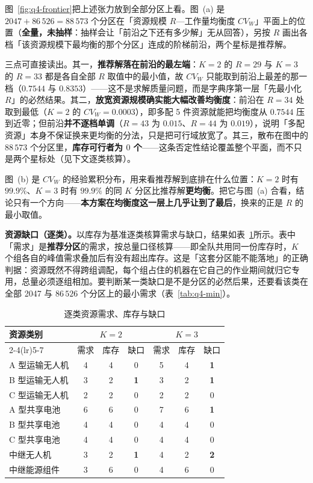 图~\ref{fig:q4-frontier}把上述张力放到全部分区上看。图~(a) 是 $2047+86\,526=88\,573$ 个分区在「资源规模 $R$—工作量均衡度 $CV_W$」平面上的位置（\textbf{全量，未抽样}：抽样会让「前沿之下还有多少解」无从回答），另按 $R$ 画出各档「该资源规模下最均衡的那个分区」连成的阶梯前沿，两个星标是推荐解。

三点可直接读出。其一，\textbf{推荐解落在前沿的最左端}：$K=2$ 的 $R=29$ 与 $K=3$ 的 $R=33$ 都是各自全部 $R$ 取值中的最小值，故 $CV_W$ 只能取到前沿上最差的那一档（$0.7544$ 与 $0.8353$）——这不是求解质量问题，而是字典序第一层「先最小化 $R$」的必然结果。其二，\textbf{放宽资源规模确实能大幅改善均衡度}：前沿在 $R=34$ 处取到最低（$K=2$ 的 $CV_W=0.0003$），即多配 5 件资源就能把均衡度从 $0.7544$ 压到近零；但前沿\textbf{并不逐档单调}（$R=43$ 为 $0.015$、$R=44$ 为 $0.019$），说明「多配资源」本身不保证换来更均衡的分法，只是把可行域放宽了。其三，散布在图中的 $88\,573$ 个分区里，\textbf{库存可行者为 $0$ 个}——这条否定性结论覆盖整个平面，而不只是两个星标处（见下文逐类核算）。

图~(b) 是 $CV_W$ 的经验累积分布，用来看推荐解到底排在什么位置：$K=2$ 时有 $99.9\%$、$K=3$ 时有 $99.9\%$ 的同 $K$ 分区比推荐解\textbf{更均衡}。把它与图~(a) 合看，结论只有一个方向——\textbf{本方案在均衡度这一层上几乎让到了最后}，换来的正是 $R$ 的最小取值。

\textbf{资源缺口（逐类）。}以库存为基准逐类核算需求与缺口，结果如表~\ref{tab:q4-gap}所示。表中「需求」是\textbf{推荐分区}的需求，按总量口径核算——即全队共用同一份库存时，$K$ 个组各自的峰值需求叠加后有没有超出库存。这是「这套分区能不能落地」的正确判据：资源既然不得跨组调配，每个组占住的机器在它自己的作业期间就归它专用，总量必须逐组相加。要判断某一类缺口是不是分区的必然后果，还要看该类在全部 2047 与 $86\,526$ 个分区上的最小需求（表~\ref{tab:q4-min}）。

\begin{table}[htbp]
	\caption{逐类资源需求、库存与缺口}
	\label{tab:q4-gap}
	\centering
	\small
	\begin{tabular}{lcccccc}
		\toprule
		\multirow{2}{*}{资源类别} & \multicolumn{3}{c}{$K=2$} & \multicolumn{3}{c}{$K=3$} \\
		\cmidrule(lr){2-4}\cmidrule(lr){5-7}
		 & 需求 & 库存 & 缺口 & 需求 & 库存 & 缺口 \\
		\midrule
		A 型运输无人机 & 4 & 4 & 0 & 5 & 4 & \textbf{1} \\
		B 型运输无人机 & 3 & 2 & \textbf{1} & 3 & 2 & \textbf{1} \\
		C 型运输无人机 & 2 & 2 & 0 & 2 & 2 & 0 \\
		A 型共享电池   & 6 & 6 & 0 & 7 & 6 & \textbf{1} \\
		B 型共享电池   & 4 & 4 & 0 & 4 & 4 & 0 \\
		C 型共享电池   & 4 & 4 & 0 & 4 & 4 & 0 \\
		中继无人机     & 3 & 2 & \textbf{1} & 4 & 2 & \textbf{2} \\
		中继能源组件   & 3 & 6 & 0 & 4 & 6 & 0 \\
		\bottomrule
	\end{tabular}
\end{table}

